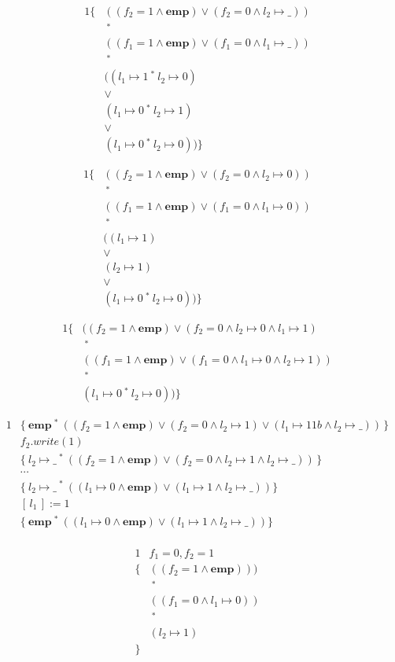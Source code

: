 \documentclass[12pt]{article}
\newcommand{\mt}[2]{
  #1 \mapsto #2
}
\newcommand{\sepcon}[2]{
  #1\ ^*\ #2
}
\newcommand{\emp}{
  \textbf{emp}
}
\begin{document}
\begin{alignat*}{1}
  \{
  & (( f_2 = 1 \land \emp) \lor ( f_2 = 0 \land \mt{l_2}{\_} )) \\
  &\ ^* \\
  & (( f_1 = 1 \land \emp) \lor ( f_1 = 0 \land \mt{l_1}{\_} )) \\
  &\ ^* \\
  & ((\sepcon{\mt{l_1}{1}}{\mt{l_2}{0}})\\
  & \lor\\
  & (\sepcon{\mt{l_1}{0}}{\mt{l_2}{1}})\\
  & \lor \\
  & (\sepcon{\mt{l_1}{0}}{\mt{l_2}{0}}))
  \}
\end{alignat*}

\begin{alignat*}{1}
  \{
  & (( f_2 = 1 \land \emp) \lor ( f_2 = 0 \land \mt{l_2}{0} )) \\
  &\ ^* \\
  & (( f_1 = 1 \land \emp) \lor ( f_1 = 0 \land \mt{l_1}{0} )) \\
  &\ ^* \\
  & ((\mt{l_1}{1})\\
  & \lor\\
  & (\mt{l_2}{1})\\
  & \lor \\
  & (\sepcon{\mt{l_1}{0}}{\mt{l_2}{0}}))
  \}
\end{alignat*}

\begin{alignat*}{1}
  \{
  & (( f_2 = 1 \land \emp) \lor ( f_2 = 0 \land \mt{l_2}{0} \land \mt{l_1}{1})\\
  &\ ^* \\
  & (( f_1 = 1 \land \emp) \lor ( f_1 = 0 \land \mt{l_1}{0} \land \mt{l_2}{1}))\\
  &\ ^* \\
  & (\sepcon{\mt{l_1}{0}}{\mt{l_2}{0}}))
  \}
\end{alignat*}

\newpage

\begin{alignat*}{1}
  & \{\ \emp\ ^*\ (( f_2 = 1 \land \emp) \lor ( f_2 = 0 \land \mt{l_2}{1}) \lor (\mt{l_1}{1}1b \land \mt{l_2}{\_}))\,\}\\
  &  f_2.write( 1 ) \\
  & \{\ \mt{l_2}{\_}\ ^*\ ((f_2 = 1 \land \emp ) \lor ( f_2 = 0 \land \mt{l_2}{1} \land \mt{l_2}{\_}))\,\} \\
  & \cdots \\
  & \{\ \mt{l_2}{\_}\ ^*\ (( \mt{l_1}{0} \land \emp) \lor ( \mt{l_1}{1} \land \mt{l_2}{\_} )) \} \\
  & [\,l_1\,] := 1 \\
  & \{\ \emp\ ^*\ (( \mt{l_1}{0} \land \emp) \lor ( \mt{l_1}{1} \land \mt{l_2}{\_} )) \} \\
\end{alignat*}

\begin{alignat*}{1}
  & f_1 = 0, f_2 = 1 \\
  \{
  & (( f_2 = 1 \land \emp) )) \\
  &\ ^* \\
  & ((f_1 = 0 \land \mt{l_1}{0} )) \\
  &\ ^* \\
  & (\mt{l_2}{1})\\
  \}
\end{alignat*}
\end{document}
